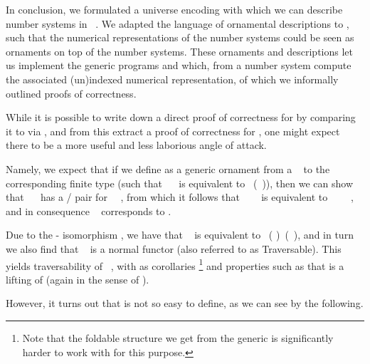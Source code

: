 In conclusion, we formulated a universe encoding  with which we can describe number systems in \ . We adapted the language of ornamental descriptions  to , such that the numerical representations of the number systems could be seen as ornaments on top of the number systems. These ornaments and descriptions let us implement the generic programs  and  which, from a number system compute the associated (un)indexed numerical representation, of which we informally outlined proofs of correctness. 

While it is possible to write down a direct proof of correctness for  by comparing it to  via , and from this extract a proof of correctness for , one might expect there to be a more useful and less laborious angle of attack. 

Namely, we expect that if we define  as a generic ornament from a \  to the corresponding finite type (such that \ \  is equivalent to \ (\ )), then we can show that \ \  has a / pair for \ \ , from which it follows that \ \ \  is equivalent to \ \ \ \ , and in consequence \  corresponds to .

Due to the - isomorphism \cite{algorn}, we have that \  is equivalent to \ ( )\ (\ ), and in turn we also find that \  is a normal functor (also referred to as Traversable). This yields traversability of \ , with as corollaries \footnote{Note that the foldable structure we get from the generic  is significantly harder to work with for this purpose.} and properties such as that  is a lifting of  (again in the sense of \cite{orntrans}).

However, it turns out that  is not so easy to define, as we can see by the following.

